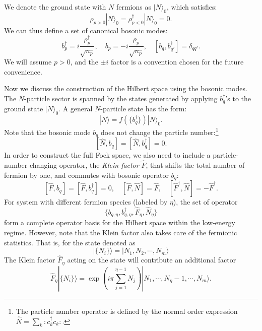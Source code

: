 We denote the ground state with $N$ fermions as $|N\rangle_0$, which satisfies:
\begin{equation}
	\rho_{p>0}|N\rangle_0 = \rho^\dagger_{p<0}|N\rangle_0 = 0.
\end{equation}
We can thus define a set of canonical bosonic modes:
\begin{equation}
	b_p^\dagger = i\frac{\rho^\dagger_p}{\sqrt{n_p}}, \quad 
	b_p = -i\frac{\rho_p}{\sqrt{n_p}}, \quad [b_q,b_{q'}^\dagger] = \delta_{qq'}.
\end{equation}
We will assume $p>0$, and the $\pm i$ factor is a convention chosen for the future convenience.

Now we discuss the construction of the Hilbert space using the bosonic modes.
The $N$-particle sector is spanned by the states generated by applying $b_q^\dagger$'s to the ground state $|N\rangle_0$.
A general $N$-particle state has the form:
\begin{equation}
	|N\rangle = f(\{b_q^\dagger\})|N\rangle_0.
\end{equation}
Note that the bosonic mode $b_q$ does not change the particle number:\footnote{The particle number operator is defined by the normal order expression $\hat{N} = \sum_k {:\mathrel{c_{k}^\dagger c_{k}}:}$.}
\begin{equation}
	\left[\hat N, b_q \right] = \left[\hat N, b_q^\dagger \right] = 0.
\end{equation}
In order to construct the full Fock space, we also need to include a particle-number-changing operator, the \textit{Klein factor} $\hat F$, that shifts the total number of fermion by one, and commutes with bosonic operator $b_q$:
\begin{equation}
	\left[\hat F, b_q \right] = \left[\hat F, b_q^\dagger \right] = 0, \quad
	\left[\hat F, \hat N \right] = \hat F, \quad 
	\left[\hat F^\dagger, \hat N \right] = -\hat F^\dagger.
\end{equation}
For system with different fermion species (labeled by $\eta$), the set of operator
\begin{equation*}
	\{b_{q,\eta}, b_{q,\eta}^\dagger, \hat F_\eta, \hat N_\eta\}
\end{equation*}
form a complete operator basis for the Hilbert space within the low-energy regime.
However, note that the Klein factor also takes care of the fermionic statistics. 
That is, for the state denoted as
\begin{equation}
	|\{N_i\}\rangle = |N_1,N_2,\cdots,N_m\rangle
\end{equation}
The Klein factor $\hat F_\eta$ acting on the state will contribute an additional factor
\begin{equation}
	\hat F_\eta|\{N_i\}\rangle = \exp\left(i\pi\sum_{j=1}^{\eta-1}N_j\right)|N_1,\cdots,N_\eta-1,\cdots,N_m\rangle.
\end{equation}

